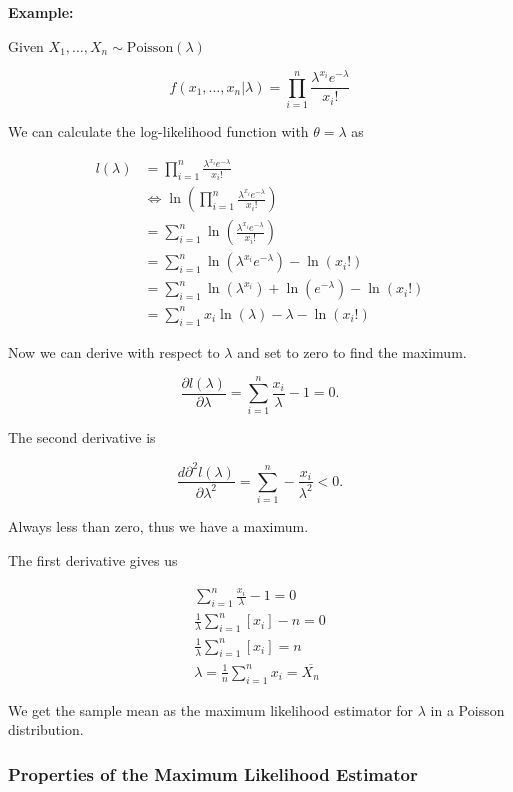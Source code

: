\textbf{Example:}

Given \(X_1, \dots, X_n \sim \mathrm{Poisson}(\lambda)\)

\[
    f(x_1, \dots, x_n | \lambda) = \prod_{i = 1}^{n} \frac{\lambda^{x_i} e^{-\lambda}}{x_i!}
\]

We can calculate the log-likelihood function with \(\theta = \lambda\) as 

\begin{align*}
    l(\lambda) &= \prod_{i = 1}^{n} \frac{\lambda^{x_i} e^{-\lambda}}{x_i!} \\ 
    &\iff \ln \left(\prod_{i = 1}^{n} \frac{\lambda^{x_i} e^{-\lambda}}{x_i!} \right) \\ 
    &= \sum_{i = 1}^{n} \ln \left(\frac{\lambda^{x_i} e^{-\lambda}}{x_i!} \right) \\ 
    &= \sum_{i = 1}^{n} \ln(\lambda^{x_i} e^{-\lambda}) - \ln(x_i!) \\ 
    &= \sum_{i = 1}^{n} \ln(\lambda^{x_i}) + \ln(e^{-\lambda}) - \ln(x_i!) \\ 
    &= \sum_{i = 1}^{n} x_i \ln(\lambda) - \lambda - \ln(x_i!)
\end{align*}

Now we can derive with respect to \(\lambda\) and set to zero to find the maximum. 

\[
    \frac{\partial l(\lambda)}{\partial \lambda} = \sum_{i = 1}^{n} \frac{x_i}{\lambda} - 1 = 0.
\]

The second derivative is

\[
    \frac{d\partial^2 l(\lambda)}{\partial \lambda^2} = \sum_{i = 1}^{n} -\frac{x_i}{\lambda^2} < 0.
\]

Always less than zero, thus we have a maximum.

The first derivative gives us

\begin{align*} 
    \sum_{i = 1}^{n} \frac{x_i}{\lambda} - 1 = 0 \\ 
    \frac{1}{\lambda}\sum_{i = 1}^{n} \left[x_i\right] - n = 0 \\  
    \frac{1}{\lambda} \sum_{i = 1}^{n} \left[x_i\right] = n \\ 
    \lambda = \frac{1}{n} \sum_{i = 1}^{n} x_i = \overline{X_n}
\end{align*}

We get the sample mean as the maximum likelihood estimator for \(\lambda\) in a Poisson distribution.

\subsubsection{Properties of the Maximum Likelihood Estimator}

